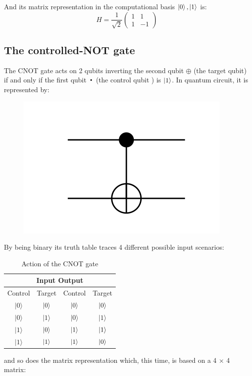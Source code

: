 And its matrix representation in the computational basis $\ket{0},\ket{1}$ is: 
\begin{equation*}
    H = \frac{1}{\sqrt{2}} \left(\begin{array}{cc}
1 & 1 \\
1 & -1
\end{array}\right)  
\end{equation*}

\subsection*{The controlled-NOT gate}
The CNOT gate acts on 2 qubits inverting the second qubit $\oplus$ (the target qubit) if and only if the first qubit $\Bigcdot$ (the control qubit ) is $\ket{1}$. In quantum circuit, it is represented by: 
\begin{figure}[H]
\centering
\includegraphics{Mainmatter/images/CNOT_gate.png}
\end{figure}
By being binary its truth table traces 4 different possible input scenarios: 
\begin{table}[h!]
    \centering
    \begin{tabular}{cc|cc}
    \hline
    \multicolumn{4}{c}{Input \quad \quad \quad \quad  \quad     Output } \\
    \hline Control& Target & Control & Target\\
\hline$|0\rangle$ & $\ket{0}$ & $\ket{0}$&$\ket{0}$\\
$|0\rangle$ & $|1\rangle$ &$|0\rangle$ & $|1\rangle$ \\
$|1\rangle$ & $\ket{0}$ & $\ket{1}$&$\ket{1}$ \\
$|1\rangle$ & $\ket{1}$ & $\ket{1}$&$\ket{0}$\\
\hline
\end{tabular}
    \caption{Action of the CNOT gate}
    \label{tab:my_label}
\end{table}
and so does the matrix representation which, this time, is based on a 4 × 4 matrix: 

